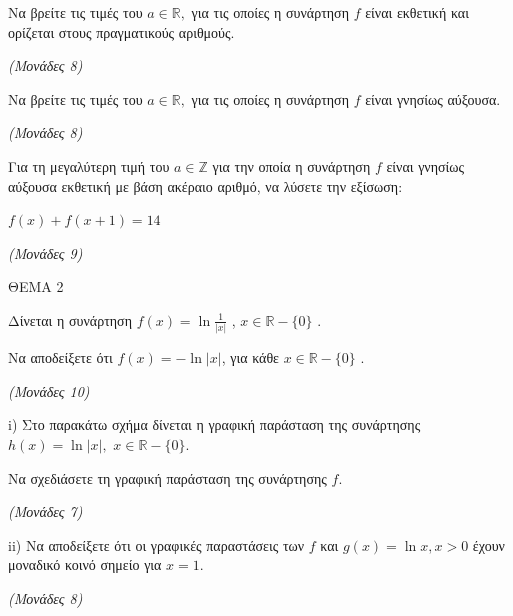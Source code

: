 \documentclass[11pt,a4paper,twoside]{book}
\newcommand{\monades}[1]{\hfill \textit{(Μονάδες #1)}}
\begin{document}
\begin{alist}
\item Να βρείτε τις τιμές του $a \in {\mathbb{R}},$ για τις οποίες η συνάρτηση $f$ είναι εκθετική και ορίζεται στους πραγματικούς αριθμούς.

\monades{8}

\item Να βρείτε τις τιμές του $a \in {\mathbb{R}},$ για τις οποίες η συνάρτηση $f$ είναι γνησίως αύξουσα.

\monades{8}

\item Για τη μεγαλύτερη τιμή του $a \in {\mathbb{Z}}$ για την οποία η συνάρτηση $f$ είναι γνησίως αύξουσα εκθετική με βάση ακέραιο αριθμό, να λύσετε την εξίσωση:

$f(x) + f(x + 1) = 14$

\monades{9}
\end{alist}

\vspace{4mm}

ΘΕΜΑ 2

Δίνεται η συνάρτηση $f(x) = \ln\frac{1}{|x|}$ , $x\mathbb{\in R - \{}0\}$ .

\begin{alist}
\item Να αποδείξετε ότι $f(x) = - \ln|x|$, για κάθε $x\mathbb{\in R - \{}0\}$ .

\monades{10}

\item i) Στο παρακάτω σχήμα δίνεται η γραφική παράσταση της συνάρτησης $h(x) = \ln|x|,$ $x\mathbb{\in R - \{}0\}$.

\begin{center}
\end{center}

Να σχεδιάσετε τη γραφική παράσταση της συνάρτησης $f.$

\monades{7}

ii) Να αποδείξετε ότι οι γραφικές παραστάσεις των $f$ και $g(x) = \ln x,x > 0$ έχουν μοναδικό κοινό σημείο για $x = 1.$

\monades{8}
\end{alist}
\end{document}
